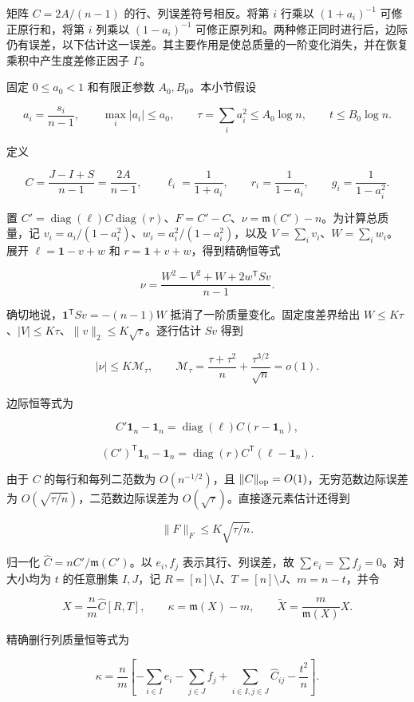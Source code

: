 \documentclass[11pt,a4paper]{article}
\begin{document}
矩阵 \(C=2A/(n-1)\) 的行、列误差符号相反。将第 \(i\) 行乘以 \((1+a_i)^{-1}\) 可修正原行和，将第 \(i\) 列乘以 \((1-a_i)^{-1}\) 可修正原列和。两种修正同时进行后，边际仍有误差，以下估计这一误差。其主要作用是使总质量的一阶变化消失，并在恢复乘积中产生度差修正因子 \(\Gamma\)。

固定 \(0\le a_0<1\) 和有限正参数 \(A_0,B_0\)。本小节假设

\[
a_i=\frac{s_i}{n-1},\qquad \max_i|a_i|\le a_0,\qquad \tau=\sum_i a_i^2\le A_0\log n,\qquad t\le B_0\log n.
\]

定义

\[
C=\frac{J-I+S}{n-1}=\frac{2A}{n-1},\qquad \ell_i=\frac1{1+a_i},\qquad r_i=\frac1{1-a_i},\qquad g_i=\frac1{1-a_i^2}.
\]

置 \(C'=\operatorname{diag}(\ell)C\operatorname{diag}(r)\)、\(F=C'-C\)、\(\nu=\mathfrak m(C')-n\)。为计算总质量，记 \(v_i=a_i/(1-a_i^2)\)、\(w_i=a_i^2/(1-a_i^2)\)，以及 \(V=\sum_i v_i\)、\(W=\sum_i w_i\)。展开 \(\ell=\mathbf 1-v+w\) 和 \(r=\mathbf 1+v+w\)，得到精确恒等式

\[
\nu=\frac{W^2-V^2+W+2w^{\mathsf T}Sv}{n-1}.
\]

确切地说，\(\mathbf 1^{\mathsf T}Sv=-(n-1)W\) 抵消了一阶质量变化。固定度差界给出 \(W\le K\tau\)、\(|V|\le K\tau\)、\(\|v\|_2\le K\sqrt\tau\)。逐行估计 \(Sv\) 得到

\[
|\nu|\le K\mathcal M_\tau,\qquad \mathcal M_\tau=\frac{\tau+\tau^2}{n}+\frac{\tau^{3/2}}{\sqrt n}=o(1).
\]

边际恒等式为

\[
C'\mathbf 1_n-\mathbf 1_n=\operatorname{diag}(\ell)C(r-\mathbf 1_n),
\]

\[
(C')^{\mathsf T}\mathbf 1_n-\mathbf 1_n=\operatorname{diag}(r)C^{\mathsf T}(\ell-\mathbf 1_n).
\]

由于 \(C\) 的每行和每列二范数为 \(O(n^{-1/2})\)，且 \(\|C\|_{\rm op}=O(1)\)，无穷范数边际误差为 \(O(\sqrt{\tau/n})\)，二范数边际误差为 \(O(\sqrt\tau)\)。直接逐元素估计还得到

\[
\|F\|_F\le K\sqrt{\tau/n}.
\]

归一化 \(\widehat C=nC'/\mathfrak m(C')\)。以 \(e_i,f_j\) 表示其行、列误差，故 \(\sum e_i=\sum f_j=0\)。对大小均为 \(t\) 的任意删集 \(I,J\)，记 \(R=[n]\setminus I\)、\(T=[n]\setminus J\)、\(m=n-t\)，并令

\[
X=\frac n m\widehat C[R,T],\qquad \kappa=\mathfrak m(X)-m,\qquad \widetilde X=\frac m{\mathfrak m(X)}X.
\]

精确删行列质量恒等式为

\begin{equation}
\kappa=\frac n m\left[-\sum_{i\in I}e_i-\sum_{j\in J}f_j+\sum_{i\in I,j\in J}\widehat C_{ij}-\frac{t^2}{n}\right].
\tag{4.1}
\label{eq-deletion-mass}
\end{equation}
\end{document}
